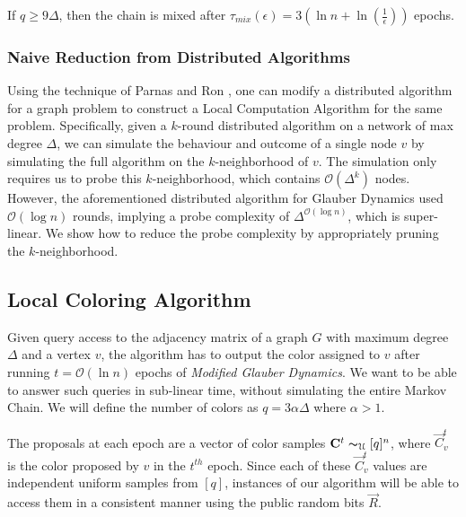 \begin{corollary}
\label{cor:modified_mixing_time}
If $q\ge 9\Delta$, then the chain is mixed after $\tau_{mix}(\epsilon) = 3\left( \ln n + \ln(\frac1{\epsilon})\right)$ epochs.
\end{corollary}
\subsubsection{Naive Reduction from Distributed Algorithms}
\label{sec:naive_reduction_from_distributed_algorithms}
Using the technique of Parnas and Ron \cite{parnas_ron},
one can modify a distributed algorithm for a graph problem to construct a Local Computation Algorithm for the same problem.
Specifically, given a $k$-round distributed algorithm on a network of max degree $\Delta$,
we can simulate the behaviour and outcome of a single node $v$ by simulating the full algorithm on the $k$-neighborhood of $v$.
The simulation only requires us to probe this $k$-neighborhood, which contains $\mathcal O(\Delta^k)$ nodes.
However, the aforementioned distributed algorithm for Glauber Dynamics used $\mathcal O(\log n)$ rounds,
implying a probe complexity of $\Delta^{\mathcal O(\log n)}$, which is super-linear.
We show how to reduce the probe complexity by appropriately pruning the $k$-neighborhood.



\subsection{Local Coloring Algorithm}%
\label{sec:local_coloring_algortihm}
Given query access to the adjacency matrix of a graph $G$ with maximum degree $\Delta$ and a vertex $v$,
the algorithm has to output the color assigned to $v$ after running $t = \mathcal O(\ln n)$ epochs of \emph{Modified Glauber Dynamics}.
We want to be able to answer such queries in sub-linear time, without simulating the entire Markov Chain.
We will define the number of colors as $q = 3\alpha\Delta$ where $\alpha > 1$.

The proposals at each epoch are a vector of color samples $\vec C^{t} \thicksim_{\mathcal U} [q]^n$,
where $\vec C^t_v$ is the color proposed by $v$ in the $t^{th}$ epoch.
Since each of these $\vec C^t_v$ values are independent uniform samples from $[q]$,
instances of our algorithm will be able to access them in a consistent manner using the public random bits $\vec R$.

